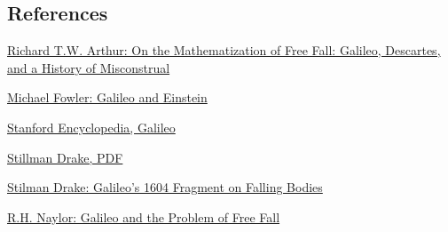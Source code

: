 \subsection*{References}


\href{https://manifold.umn.edu/read/untitled-7ca18210-217d-40f2-83fe-b0add1d84ede/section/bb88e7f4-7451-4b26-9056-a21f51f49091}{Richard T.W. Arthur: On the
Mathematization of Free Fall:
Galileo, Descartes, and a History of
Misconstrual}

\href{http://galileo.phys.virginia.edu/classes/109.mf1i.fall03/lectures09.pdf}{Michael Fowler: Galileo and
Einstein}

\href{https://plato.stanford.edu/entries/galileo/#3}{Stanford Encyclopedia,
Galileo}

\href{https://www.sciencedirect.com/science/article/pii/0315086074900020}{Stillman Drake,
PDF}

\href{https://philpapers.org/rec/DRAGF}{Stilman Drake: Galileo's
1604 Fragment on Falling
Bodies}

\href{https://www.cambridge.org/core/journals/british-journal-for-the-history-of-science/article/galileo-and-the-problem-of-free-fall/EFEE65B06845C3AEAA847AAC7A635796}{R.H. Naylor: Galileo
and the Problem of Free
Fall}